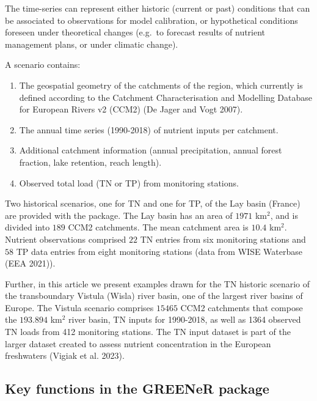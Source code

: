 The time-series can represent either historic (current or past) conditions that can be associated to observations for model calibration, or hypothetical conditions foreseen under theoretical changes (e.g.~to forecast results of nutrient management plans, or under climatic change).

A scenario contains:

\begin{enumerate}
\def\labelenumi{\arabic{enumi}.}
\item
  The geospatial geometry of the catchments of the region, which currently is defined according to the Catchment Characterisation and Modelling Database for European Rivers v2 (CCM2) (De Jager and Vogt 2007).
\item
  The annual time series (1990-2018) of nutrient inputs per catchment.
\item
  Additional catchment information (annual precipitation, annual forest fraction, lake retention, reach length).
\item
  Observed total load (TN or TP) from monitoring stations.
\end{enumerate}

\noindent Two historical scenarios, one for TN and one for TP, of the Lay basin (France) are provided with the  package. The Lay basin has an area of \(1971\) km\(^2\), and is divided into \(189\) CCM2 catchments. The mean catchment area is \(10.4\) km\(^2\). Nutrient observations comprised \(22\) TN entries from six monitoring stations and \(58\) TP data entries from eight monitoring stations (data from WISE Waterbase (EEA 2021)).

Further, in this article we present examples drawn for the TN historic scenario of the transboundary Vistula (Wisla) river basin, one of the largest river basins of Europe. The Vistula scenario comprises \(15465\) CCM2 catchments that compose the \(193.894\) km\(^2\) river basin, TN inputs for 1990-2018, as well as 1364 observed TN loads from 412 monitoring stations. The TN input dataset is part of the larger dataset created to assess nutrient concentration in the European freshwaters (Vigiak et al. 2023).

\hypertarget{key-functions-in-the-greener-package}{%
\subsection{Key functions in the GREENeR package}\label{key-functions-in-the-greener-package}}

